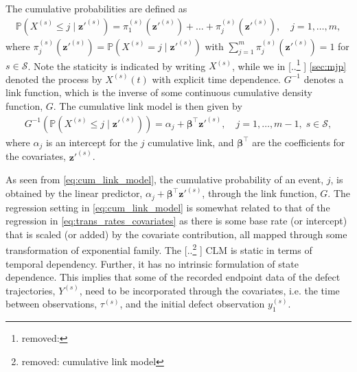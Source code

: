\documentclass{article}
\providecommand{\DIFadd}[1]{{\protect\color{blue} \sf #1}} %
\providecommand{\DIFdel}[1]{{\protect\color{red} [..\footnote{removed: #1} ]}} %
\providecommand{\DIFaddbegin}{} %
\providecommand{\DIFaddend}{} %
\providecommand{\DIFdelbegin}{} %
\providecommand{\DIFdelend}{} %
\begin{document}
The cumulative probabilities are defined as
\begin{align*}
     \mathds{P}\left( X^{(s)} \leq j \; \vert \; \bm{z}'^{(s)} \right) = 
     \pi_1^{(s)}(\bm{z}'^{(s)}) + \dots + \pi_j^{(s)}(\bm{z}'^{(s)}), \quad j = 1, \dots, m, 
\end{align*}
where $\pi^{(s)}_j\left(\bm{z}'^{(s)}\right) = \mathds{P} \left(  X^{(s)} = j \; \vert \; \bm{z}'^{(s)} \right)$ with $\sum_{j = 1}^m \pi^{(s)}_j(\bm{z}'^{(s)}) = 1$ for $s \in \mathcal{S}$. 
Note the staticity is indicated by writing $X^{(s)}$, while we in \DIFdelbegin \DIFdel{ }\DIFdelend \DIFaddbegin \DIFadd{\cref{sec:mjp} }\DIFaddend denoted the process by $X^{(s)}(t)$ with explicit time dependence.
$G^{-1}$ denotes a link function, which is the inverse of some continuous cumulative density function, $G$.
The cumulative link model is then given by
\begin{align}
    G^{-1} \left(  \mathds{P}\left( X^{(s)} \leq j \; \vert \; \bm{z}'^{(s)} \right) \right)
    = \alpha_j + \bm{\beta}^\top \bm{z}'^{(s)}, \quad j = 1, \dots, m-1, \; s \in \mathcal{S}, \label{eq:cum_link_model}
\end{align}
where $\alpha_j$ is an intercept for the $j$ cumulative link, and $\bm{\beta}^\top$ are the coefficients for the covariates, $\bm{z}'^{(s)}$. 

As seen from \cref{eq:cum_link_model}, the cumulative probability of an event, $j$, is obtained by the linear predictor, $\alpha_j + \bm{\beta}^\top \bm{z}'^{(s)}$, through the link function, $G$.
The regression setting in \cref{eq:cum_link_model} is somewhat related to that of the regression in \cref{eq:trans_rates_covariates} as there is some base rate (or intercept) that is scaled (or added) by the covariate contribution, all mapped through some transformation of exponential family. %
The \DIFdelbegin \DIFdel{cumulative link model }\DIFdelend \DIFaddbegin \DIFadd{CLM }\DIFaddend is static in terms of temporal dependency. Further, it has no intrinsic formulation of state dependence. This implies that some of the recorded endpoint data of the defect trajectories, $Y^{(s)}$, need to be incorporated through the covariates, i.e. the time between observations, $\tau^{(s)}$, and the initial defect observation $y_1^{(s)}$. %
\end{document}
